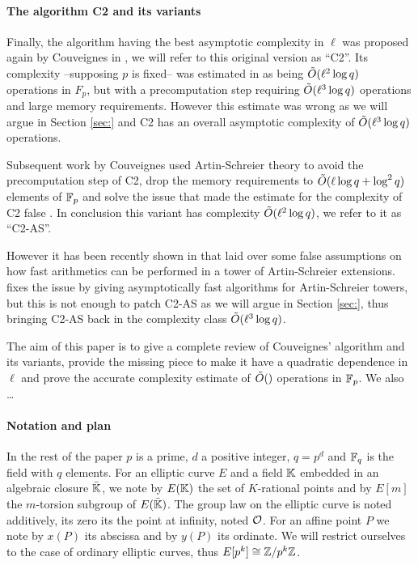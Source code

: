 \paragraph{The algorithm C2 and its variants}
Finally, the algorithm having the best asymptotic complexity in $\ell$
was proposed again by Couveignes in \cite{Cou96}, we will refer to
this original version as ``C2''. Its complexity --supposing $p$ is
fixed-- was estimated in \cite{Cou96} as being $\tilde{O}(\ell^2\log q)$
operations in $F_p$, but with a precomputation step requiring
$\tilde{O}(\ell^3\log q)$ operations and large memory
requirements. However this estimate was wrong as we will argue in
Section \ref{sec:} and C2 has an overall asymptotic complexity of
$\tilde{O}(\ell^3\log q)$ operations.

Subsequent work by Couveignes used Artin-Schreier theory to avoid the
precomputation step of C2, drop the memory requirements to
$\tilde{O}(\ell\log q + \log^2 q)$ elements of $\mathbb{F}_p$ and solve the issue
that made the estimate for the complexity of C2 false \cite{Cou00}. In
conclusion this variant has complexity $\tilde{O}(\ell^2\log q)$, we
refer to it as ``C2-AS''.

However it has been recently shown in \cite{DFS09} that \cite{Cou00}
laid over some false assumptions on how fast arithmetics can be
performed in a tower of Artin-Schreier extensions. \cite{DFS09} fixes
the issue by giving asymptotically fast algorithms for Artin-Schreier
towers, but this is not enough to patch C2-AS as we will argue in
Section \ref{sec:}, thus bringing C2-AS back in the complexity class
$\tilde{O}(\ell^3\log q)$.

The aim of this paper is to give a complete review of Couveignes'
algorithm and its variants, provide the missing piece to make it have
a quadratic dependence in $\ell$ and prove the accurate complexity
estimate of $\tilde{O}()$ operations in $\mathbb{F}_p$. We also \dots

\paragraph{Notation and plan}
In the rest of the paper $p$ is a prime, $d$ a positive integer,
$q=p^d$ and $\mathbb{F}_q$ is the field with $q$ elements. For an elliptic
curve $E$ and a field $\mathbb{K}$ embedded in an algebraic closure
$\bar{\mathbb{K}}$, we note by $E(\mathbb{K})$ the set of $K$-rational points and by
$E[m]$ the $m$-torsion subgroup of $E(\bar{\mathbb{K}})$. The group law on
the elliptic curve is noted additively, its zero its the point at
infinity, noted $\mathcal{O}$. For an affine point $P$ we note by $x(P)$ its
abscissa and by $y(P)$ its ordinate. We will restrict ourselves to the
case of ordinary elliptic curves, thus $E[p^k]\cong\mathbb{Z}/p^k\mathbb{Z}$.

